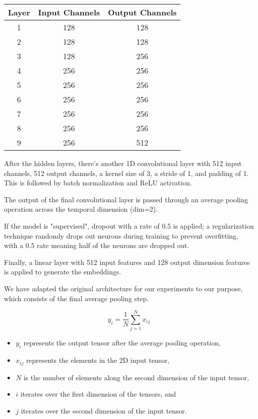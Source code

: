 \begin{tabular}{|c|c|c|}
\hline
\textbf{Layer} & \textbf{Input Channels} & \textbf{Output Channels} \\
\hline
1 & 128 & 128 \\
\hline
2 & 128 & 128 \\
\hline
3 & 128 & 256 \\
\hline
4 & 256 & 256 \\
\hline
5 & 256 & 256 \\
\hline
6 & 256 & 256 \\
\hline
7 & 256 & 256 \\
\hline
8 & 256 & 256 \\
\hline
9 & 256 & 512 \\
\hline
\end{tabular}

After the hidden layers, there's another 1D convolutional layer with 512 input channels, 512 output channels, a kernel size of 3, a stride of 1, and padding of 1. This is followed by batch normalization and ReLU activation.

The output of the final convolutional layer is passed through an average pooling operation across the temporal dimension (dim=2).

If the model is "supervised", dropout with a rate of 0.5 is applied; a regularization technique randomly drops out neurons during training to prevent overfitting, with a 0.5 rate meaning half of the neurons are dropped out.



Finally, a linear layer with 512 input features and 128 output dimension features is applied to generate the embeddings.



We have adapted the original architecture for our experiments to our purpose, which consists of the final average pooling step.

\begin{equation}
y_i = \frac{1}{N} \sum_{j=1}^{N} x_{ij}
\end{equation}

\begin{itemize}
  \item \(y_i\) represents the output tensor after the average pooling operation,
  \item \(x_{ij}\) represents the elements in the 2D input tensor,
  \item \(N\) is the number of elements along the second dimension of the input tensor,
  \item \(i\) iterates over the first dimension of the tensors, and
  \item \(j\) iterates over the second dimension of the input tensor.
\end{itemize}


